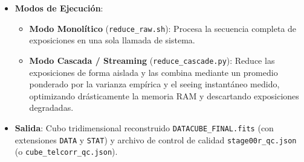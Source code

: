 \documentclass[11pt,a4paper]{article}
\begin{document}
\begin{itemize}[leftmargin=1.0cm]
\begin{enumerate}
        \item \texttt{muse\_scipost}: Ensamblado geométrico y remuestreo 3D de los millones de píxeles dispersos sobre una grilla regular cartesiana tridimensional, corrección heliocéntrica y baricéntrica de velocidad radial, y calibración preliminar de flujo con estrellas estándar.
    \end{enumerate}
    \item \textbf{Modos de Ejecución}:
    \begin{itemize}
        \item \textbf{Modo Monolítico} (\texttt{reduce\_raw.sh}): Procesa la secuencia completa de exposiciones en una sola llamada de sistema.
        \item \textbf{Modo Cascada / Streaming} (\texttt{reduce\_cascade.py}): Reduce las exposiciones de forma aislada y las combina mediante un promedio ponderado por la varianza empírica y el seeing instantáneo medido, optimizando drásticamente la memoria RAM y descartando exposiciones degradadas.
    \end{itemize}
    \item \textbf{Salida}: Cubo tridimensional reconstruido \texttt{DATACUBE\_FINAL.fits} (con extensiones \texttt{DATA} y \texttt{STAT}) y archivo de control de calidad \texttt{stage00r\_qc.json} (o \texttt{cube\_telcorr\_qc.json}).
\end{itemize}
\end{document}

